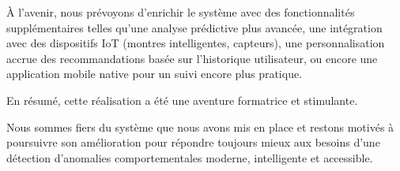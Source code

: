 À l'avenir, nous prévoyons d'enrichir le système avec des fonctionnalités supplémentaires telles qu'une analyse prédictive plus avancée, une intégration avec des dispositifs IoT (montres intelligentes, capteurs), une personnalisation accrue des recommandations basée sur l'historique utilisateur, ou encore une application mobile native pour un suivi encore plus pratique.

En résumé, cette réalisation a été une aventure formatrice et stimulante.

Nous sommes fiers du système que nous avons mis en place et restons motivés à poursuivre son amélioration pour répondre toujours mieux aux besoins d'une détection d'anomalies comportementales moderne, intelligente et accessible.

